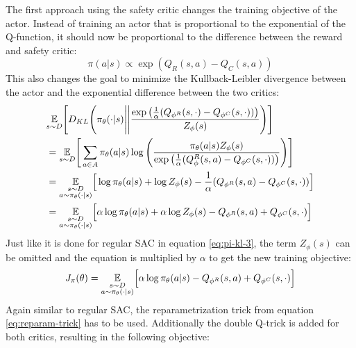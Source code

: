 The first approach using the safety critic changes the training objective of the actor. Instead of training an actor that is proportional to the exponential of the Q-function, it should now be proportional to the difference between the reward and safety critic:
\begin{equation}
    \pi(a| s) \propto \exp(Q_R(s, a) - Q_C(s,a))
\end{equation}
This also changes the goal to minimize the Kullback-Leibler divergence between the actor and the exponential difference between the two critics:
\begin{align}
    & \underset{s\sim D}{\mathbb{E}}\Bigg[D_{KL}\Bigg(\pi_\theta(\cdot|s)\Bigg|\Bigg|\frac{\exp\big(\frac{1}{\alpha}(Q_{\phi^R}(s,\cdot)-Q_{\phi^C}(s,\cdot))\big)}{Z_\phi(s)}\Bigg)\Bigg]\\
    &= \underset{s\sim D}{\mathbb{E}}\Bigg[\sum_{a\in A} \pi_\theta(a|s) \log\Bigg(\frac{\pi_\theta(a|s)Z_\phi(s)}{\exp\big(\frac{1}{\alpha}(Q_\phi^R(s,a)-Q_{\phi^C}(s,\cdot))\big)}\Bigg)\Bigg]\\
    &= \underset{\begin{subarray}{c}
        s\sim D\\
        a\sim \pi_\theta(\cdot|s)
    \end{subarray}}{\mathbb{E}}\Big[\log\pi_\theta(a|s)+\log Z_\phi(s)-\frac{1}{\alpha}(Q_{\phi^R}(s,a)-Q_{\phi^C}(s,\cdot))\Big]\\
    &= \underset{\begin{subarray}{c}
        s\sim D\\
        a\sim \pi_\theta(\cdot|s)
    \end{subarray}}{\mathbb{E}}\Big[\alpha\log\pi_\theta(a|s)+\alpha\log Z_\phi(s)-Q_{\phi^R}(s,a)+Q_{\phi^C}(s,\cdot)\Big]
\end{align}
Just like it is done for regular SAC in equation \ref{eq:pi-kl-3}, the term $Z_\phi(s)$ can be omitted and the equation is multiplied by $\alpha$ to get the new training objective:
\begin{equation}
    J_\pi(\theta) = \underset{\begin{subarray}{c}
        s\sim D\\
        a\sim \pi_\theta(\cdot|s)
    \end{subarray}}{\mathbb{E}}\Big[\alpha\log\pi_\theta(a|s)-Q_{\phi^R}(s,a)+Q_{\phi^C}(s,\cdot)\Big]
    \label{eq:pi-cost-objective-no-reparam}
\end{equation}
Again similar to regular SAC, the reparametrization trick from equation \ref{eq:reparam-trick} has to be used. Additionally the double Q-trick is added for both critics, resulting in the following objective:
